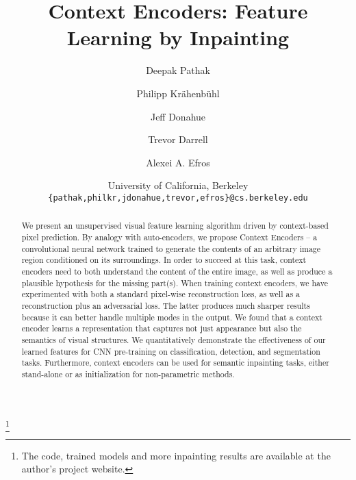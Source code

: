 \documentclass[10pt,twocolumn,letterpaper]{article}
\newcommand\blfootnote[1]{%
\begingroup
\renewcommand\thefootnote{}\footnote{#1}%
\addtocounter{footnote}{-1}%
\endgroup
}
\begin{document}
\title{Context Encoders: Feature Learning by Inpainting}

\author{Deepak Pathak
\and
Philipp Kr\"ahenb\"uhl
\and
Jeff Donahue
\and
Trevor Darrell
\and
Alexei A. Efros\\
\and
University of California, Berkeley\\
{\tt\small \{pathak,philkr,jdonahue,trevor,efros\}@cs.berkeley.edu}
}

\maketitle

\begin{abstract}
We present an unsupervised visual feature learning algorithm driven by context-based pixel prediction.
By analogy with auto-encoders, we propose Context Encoders -- a convolutional neural network trained to generate the contents of an arbitrary image region conditioned on its surroundings.
In order to succeed at this task, context encoders need to both understand the content of the entire image, as well as produce a plausible hypothesis for the missing part(s).
When training context encoders, we have experimented with
both a standard pixel-wise reconstruction loss, as well as a reconstruction plus an adversarial loss.  The latter produces much sharper results because it can better handle multiple modes in the output.
We found that a context encoder learns a representation that captures not just appearance but also the semantics of visual structures.
We quantitatively demonstrate the effectiveness of our learned features for CNN pre-training on classification, detection, and segmentation tasks.
Furthermore, context encoders can be used for semantic inpainting tasks, either stand-alone or as initialization for non-parametric methods.



\end{abstract}

\blfootnote{The code, trained models and more inpainting results are available at the author's project website.}
\end{document}

